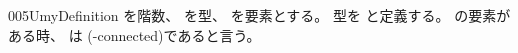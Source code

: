 \documentclass[index]{subfiles}
\begin{document}
\begin{myBlock}{005U}{myDefinition}
  を階数、
  を型、
  を要素とする。
  型を
  と定義する。
  の要素がある時、
  は
  (-connected)であると言う。
\end{myBlock}
\end{document}
